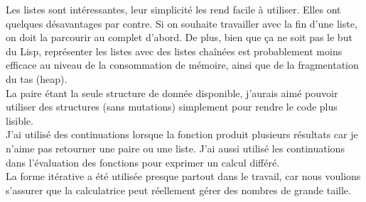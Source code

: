 \documentclass[a4paper,12pt,french]{article}
\begin{document}
        Les listes sont intéressantes, leur simplicité les rend facile à utiliser. Elles ont quelques désavantages par contre. Si on souhaite travailler avec la fin d'une liste, on doit la parcourir au complet d'abord. De plus, bien que ça ne soit pas le but du Lisp, représenter les listes avec des listes chaînées est probablement moins efficace au niveau de la consommation de mémoire, ainsi que de la fragmentation du tas (heap).\\

        La paire étant la seule structure de donnée disponible, j'aurais aimé pouvoir utiliser des structures (sans mutations) simplement pour rendre le code plus lisible.\\

        J'ai utilisé des continuations lorsque la fonction produit plusieurs résultats car je n'aime pas retourner une paire ou une liste. J'ai aussi utilisé les continuations dans l'évaluation des fonctions pour exprimer un calcul différé.\\

        La forme itérative a été utilisée presque partout dans le travail, car nous voulions s'assurer que la calculatrice peut réellement gérer des nombres de grande taille.
\end{document}
